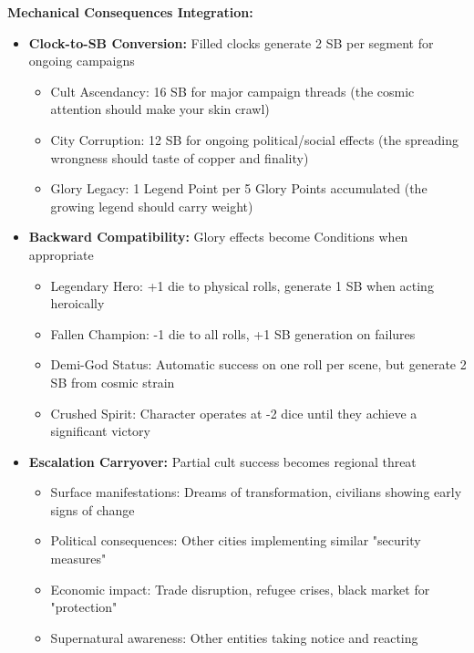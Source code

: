 \documentclass[11pt]{article}
\begin{document}
\begin{itemize}
\begin{itemize}
\begin{itemize}
\textbf{Mechanical Consequences Integration:}
\begin{itemize}
\item \textbf{Clock-to-SB Conversion:} Filled clocks generate 2 SB per segment for ongoing campaigns
  \begin{itemize}
  \item Cult Ascendancy: 16 SB for major campaign threads (the cosmic attention should make your skin crawl)
  \item City Corruption: 12 SB for ongoing political/social effects (the spreading wrongness should taste of copper and finality)
  \item Glory Legacy: 1 Legend Point per 5 Glory Points accumulated (the growing legend should carry weight)
  \end{itemize}
\item \textbf{Backward Compatibility:} Glory effects become Conditions when appropriate
  \begin{itemize}
  \item Legendary Hero: +1 die to physical rolls, generate 1 SB when acting heroically
  \item Fallen Champion: -1 die to all rolls, +1 SB generation on failures
  \item Demi-God Status: Automatic success on one roll per scene, but generate 2 SB from cosmic strain
  \item Crushed Spirit: Character operates at -2 dice until they achieve a significant victory
  \end{itemize}
\item \textbf{Escalation Carryover:} Partial cult success becomes regional threat
  \begin{itemize}
  \item Surface manifestations: Dreams of transformation, civilians showing early signs of change
  \item Political consequences: Other cities implementing similar "security measures"
  \item Economic impact: Trade disruption, refugee crises, black market for "protection"
  \item Supernatural awareness: Other entities taking notice and reacting
  \end{itemize}
\end{itemize}


\end{itemize}
\end{itemize}
\end{itemize}
\end{document}
